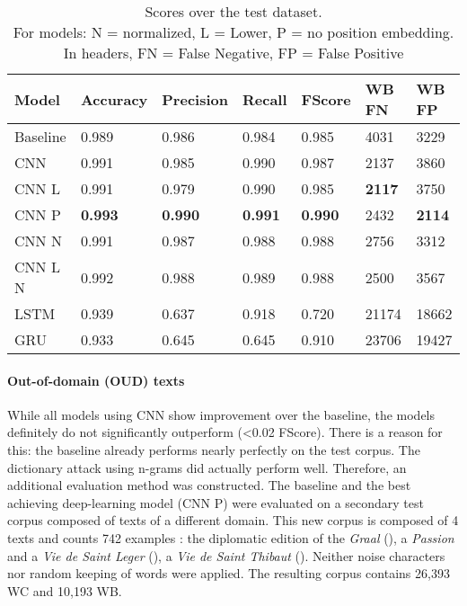 \documentclass{jdmdh}
\begin{document}
\begin{table}[!ht]
\centering
\begin{tabular}{lllllll}
\hline
Model    & Accuracy & Precision & Recall & FScore & WB FN & WB FP \\ \hline
Baseline & 0.989    & 0.986     & 0.984  & 0.985 & 4031 & 3229 \\
CNN      & 0.991    & 0.985     & 0.990  & 0.987 & 2137 & 3860 \\
CNN L    & 0.991    & 0.979     & 0.990  & 0.985 & \textbf{2117} & 3750 \\
CNN P    & \textbf{0.993}    & \textbf{0.990}& \textbf{0.991}  & \textbf{0.990} & 2432 & \textbf{2114} \\
CNN N    & 0.991    & 0.987     & 0.988  & 0.988 & 2756 & 3312 \\
CNN L N  & 0.992    & 0.988     & 0.989  & 0.988 & 2500 & 3567 \\
LSTM     & 0.939    & 0.637     & 0.918  & 0.720 & 21174 & 18662 \\
GRU     & 0.933    & 0.645     & 0.645  & 0.910 & 23706 & 19427 \\ \hline
\end{tabular}
\caption{Scores over the test dataset. \\\hspace{\textwidth}For models: N = normalized, L = Lower, P = no position embedding. \\\hspace{\textwidth}In headers, FN = False Negative, FP = False Positive}
\label{tab:scores}
\end{table}

\paragraph{Out-of-domain (OUD) texts}

While all models using CNN show improvement over the baseline, the models definitely do not significantly outperform (\textless 0.02 FScore). There is a reason for this: the baseline already performs nearly perfectly on the test corpus. The dictionary attack using n-grams did actually perform well. Therefore, an additional evaluation method was constructed. The baseline and the best achieving deep-learning model (CNN P) were evaluated on a secondary test corpus composed of texts of a different domain. This new corpus is composed of 4 texts and counts 742 examples : the diplomatic edition of the \textit{Graal} (\citet{graal}), a \textit{Passion} and a \textit{Vie de Saint Leger}  (\citet{old_french_corpus}), a \textit{Vie de Saint Thibaut} (\citet{theobaldus}). Neither noise characters nor random keeping of words were applied. The resulting corpus contains 26,393 WC and 10,193 WB.
\end{document}
